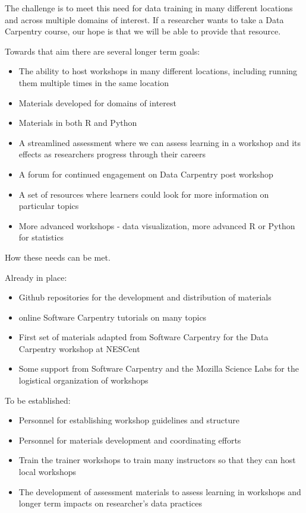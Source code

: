 \documentclass[11pt]{article}
\begin{document}
The challenge is to meet this need for data training in many different locations and across multiple domains of interest.
 If a researcher wants to take a Data Carpentry course, our hope is that we will be able to provide that resource. 
 
Towards that aim there are several longer term goals:

\begin{itemize}
\item The ability to host workshops in many different locations, including running
them multiple times in the same location 
\item Materials developed for domains of interest 
\item Materials in both R and Python 
\item A streamlined assessment where we can assess learning in a workshop and its effects
as researchers progress through their careers
\item A forum for continued engagement on Data Carpentry post workshop
\item A set of resources where learners could look for more information on particular topics
\item More advanced workshops - data visualization, more advanced R or Python for statistics
\end{itemize}


How these needs can be met.

Already in place:
\begin{itemize}
\item Github repositories for the development and distribution of materials
\item online Software Carpentry tutorials on many topics
\item First set of materials adapted from Software Carpentry for the Data Carpentry workshop at NESCent
\item Some support from Software Carpentry and the Mozilla Science Labs for the logistical organization of workshops
\end{itemize}

To be established:
\begin{itemize}
\item Personnel for establishing workshop guidelines and structure
\item Personnel for materials development and coordinating efforts
\item Train the trainer workshops to train many instructors so that they can host local
workshops
\item The development of assessment materials to assess learning in workshops and longer term impacts on 
researcher's data practices
\end{itemize}
\end{document}
